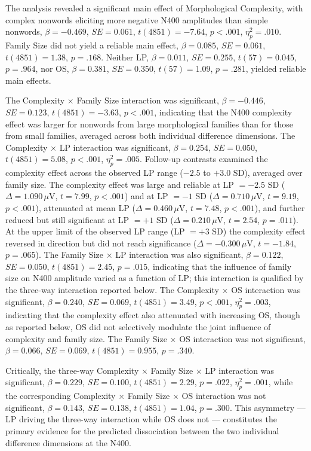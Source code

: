 \documentclass[utf8]{FrontiersinHarvard} %
\begin{document}
	The analysis revealed a significant main effect of Morphological Complexity, with complex nonwords eliciting more negative N400 amplitudes than simple nonwords, $\beta = -0.469$, $SE = 0.061$, $t(4851) = -7.64$, $p < .001$, $\eta^2_p = .010$. Family Size did not yield a reliable main effect, $\beta = 0.085$, $SE = 0.061$, $t(4851) = 1.38$, $p = .168$. Neither LP, $\beta = 0.011$, $SE = 0.255$, $t(57) = 0.045$, $p = .964$, nor OS, $\beta = 0.381$, $SE = 0.350$, $t(57) = 1.09$, $p = .281$, yielded reliable main effects.
	
	The Complexity $\times$ Family Size interaction was significant, $\beta = -0.446$, $SE = 0.123$, $t(4851) = -3.63$, $p < .001$, indicating that the N400 complexity effect was larger for nonwords from large morphological families than for those from small families, averaged across both individual difference dimensions. The Complexity $\times$ LP interaction was significant, $\beta = 0.254$, $SE = 0.050$, $t(4851) = 5.08$, $p < .001$, $\eta^2_p = .005$. Follow-up contrasts examined the complexity effect across the observed LP range ($-2.5$ to $+3.0$ SD), averaged over family size. The complexity effect was large and reliable at LP $= -2.5$ SD ($\Delta = 1.090\,\mu$V, $t = 7.99$, $p < .001$) and at LP $= -1$ SD ($\Delta = 0.710\,\mu$V, $t = 9.19$, $p < .001$), attenuated at mean LP ($\Delta = 0.460\,\mu$V, $t = 7.48$, $p < .001$), and further reduced but still significant at LP $= +1$ SD ($\Delta = 0.210\,\mu$V, $t = 2.54$, $p = .011$). At the upper limit of the observed LP range (LP $= +3$ SD) the complexity effect reversed in direction but did not reach significance ($\Delta = -0.300\,\mu$V, $t = -1.84$, $p = .065$).  The Family Size $\times$ LP interaction was also significant, $\beta = 0.122$, $SE = 0.050$, $t(4851) = 2.45$, $p = .015$, indicating that the influence of family size on N400 amplitude varied as a function of LP; this interaction is qualified by the three-way interaction reported below. The Complexity $\times$ OS interaction was significant, $\beta = 0.240$, $SE = 0.069$, $t(4851) = 3.49$, $p < .001$, $\eta^2_p = .003$, indicating that the complexity effect also attenuated with increasing OS, though as reported below, OS did not selectively modulate the joint influence of complexity and family size. The Family Size $\times$ OS interaction was not significant, $\beta = 0.066$, $SE = 0.069$, $t(4851) = 0.955$, $p = .340$.
	
	Critically, the three-way Complexity $\times$ Family Size $\times$ LP interaction was significant, $\beta = 0.229$, $SE = 0.100$, $t(4851) = 2.29$, $p = .022$, $\eta^2_p = .001$, while the corresponding Complexity $\times$ Family Size $\times$ OS interaction was not significant, $\beta = 0.143$, $SE = 0.138$, $t(4851) = 1.04$, $p = .300$. This asymmetry --- LP driving the three-way interaction while OS does not --- constitutes the primary evidence for the predicted dissociation between the two individual difference dimensions at the N400.
	
\end{document}
